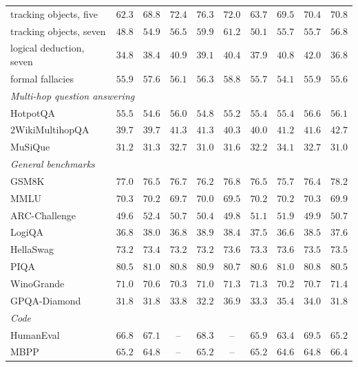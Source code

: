 \begin{tabular}{lccccccccc}
\quad tracking objects, five & $62.3$ & $68.8$ & $72.4$ & $\mathbf{76.3}$ & $72.0$ & $63.7$ & $69.5$ & $70.4$ & $70.8$ \\
\quad tracking objects, seven & $48.8$ & $54.9$ & $56.5$ & $59.9$ & $\mathbf{61.2}$ & $50.1$ & $55.7$ & $55.7$ & $56.8$ \\
\quad logical deduction, seven & $34.8$ & $38.4$ & $40.9$ & $39.1$ & $40.4$ & $37.9$ & $40.8$ & $\mathbf{42.0}$ & $36.8$ \\
\quad formal fallacies & $55.9$ & $57.6$ & $56.1$ & $56.3$ & $\mathbf{58.8}$ & $55.7$ & $54.1$ & $55.9$ & $55.6$ \\
\midrule
\multicolumn{10}{l}{\textit{Multi-hop question answering}} \\
\quad HotpotQA & $55.5$ & $54.6$ & $56.0$ & $54.8$ & $55.2$ & $55.4$ & $55.4$ & $\mathbf{56.6}$ & $56.1$ \\
\quad 2WikiMultihopQA & $39.7$ & $39.7$ & $41.3$ & $41.3$ & $40.3$ & $40.0$ & $41.2$ & $41.6$ & $\mathbf{42.7}$ \\
\quad MuSiQue & $31.2$ & $31.3$ & $32.7$ & $31.0$ & $31.6$ & $32.2$ & $\mathbf{34.1}$ & $32.7$ & $31.0$ \\
\midrule
\multicolumn{10}{l}{\textit{General benchmarks}} \\
\quad GSM8K & $77.0$ & $76.5$ & $76.7$ & $76.2$ & $76.8$ & $76.5$ & $75.7$ & $76.4$ & $\mathbf{78.2}$ \\
\quad MMLU & $\mathbf{70.3}$ & $70.2$ & $69.7$ & $70.0$ & $69.5$ & $70.2$ & $70.2$ & $70.3$ & $69.9$ \\
\quad ARC-Challenge & $49.6$ & $\mathbf{52.4}$ & $50.7$ & $50.4$ & $49.8$ & $51.1$ & $51.9$ & $49.9$ & $50.7$ \\
\quad LogiQA & $36.8$ & $38.0$ & $36.8$ & $\mathbf{38.9}$ & $38.4$ & $37.5$ & $36.6$ & $38.5$ & $37.6$ \\
\quad HellaSwag & $73.2$ & $73.4$ & $73.2$ & $73.2$ & $73.6$ & $73.3$ & $\mathbf{73.6}$ & $73.5$ & $73.5$ \\
\quad PIQA & $80.5$ & $\mathbf{81.0}$ & $80.8$ & $80.9$ & $80.7$ & $80.6$ & $81.0$ & $80.8$ & $80.5$ \\
\quad WinoGrande & $71.0$ & $70.6$ & $70.3$ & $71.0$ & $71.3$ & $71.3$ & $70.2$ & $70.7$ & $\mathbf{71.4}$ \\
\quad GPQA-Diamond & $31.8$ & $31.8$ & $33.8$ & $32.2$ & $\mathbf{36.9}$ & $33.3$ & $35.4$ & $34.0$ & $31.8$ \\
\midrule
\multicolumn{10}{l}{\textit{Code}} \\
\quad HumanEval & $66.8$ & $67.1$ & -- & $68.3$ & -- & $65.9$ & $63.4$ & $\mathbf{69.5}$ & $65.2$ \\
\quad MBPP & $65.2$ & $64.8$ & -- & $65.2$ & -- & $65.2$ & $64.6$ & $64.8$ & $\mathbf{66.4}$ \\
\bottomrule
\end{tabular}
